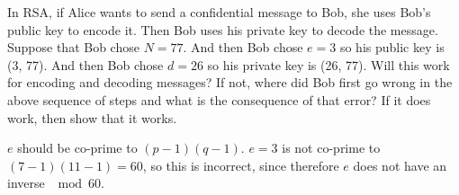 \question In RSA, if Alice wants to send a confidential message to Bob, 
she uses Bob’s public key to encode it. Then Bob uses his private key 
to decode the message. Suppose that Bob chose $N = 77$. And then Bob 
chose $e = 3$ so his public key is (3, 77). And then Bob chose $d = 26$ 
so his private key is (26, 77). \newline
Will this work for encoding and decoding messages? If not, where did 
Bob first go wrong in the above sequence of steps and what is the 
consequence of that error? If it does work, then show that it works.

\begin{solution}[2 in]
$e$ should be co-prime to $(p - 1)(q - 1)$.\newline
$e = 3$ is not co-prime to $(7 - 1)(11 - 1) = 60$, so this is incorrect, 
since therefore $e$ does not have an inverse $\mod 60$. 
\end{solution}